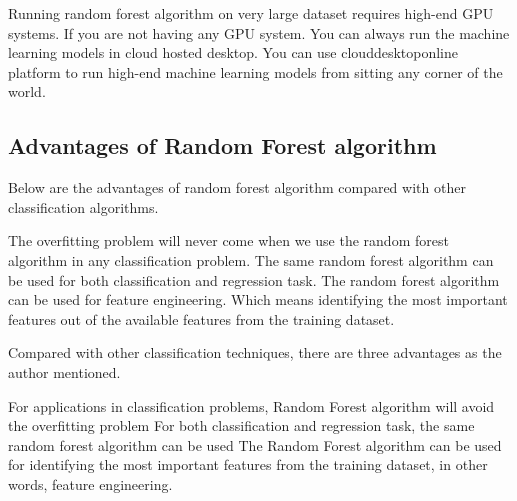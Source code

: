 Running random forest algorithm on very large dataset requires high-end GPU systems. If you are not having any GPU system. You can always run the machine learning models in cloud hosted desktop. You can use clouddesktoponline platform to run high-end machine learning models from sitting any corner of the world.

\subsection*{Advantages of Random Forest algorithm}
Below are the advantages of random forest algorithm compared with other classification algorithms.

The overfitting problem will never come when we use the random forest algorithm in any classification problem.
The same random forest algorithm can be used for both classification and regression task.
The random forest algorithm can be used for feature engineering.
Which means identifying the most important features out of the available features from the training dataset.


Compared with other classification techniques, there are three advantages as the author mentioned.

For applications in classification problems, Random Forest algorithm will avoid the overfitting problem
For both classification and regression task, the same random forest algorithm can be used
The Random Forest algorithm can be used for identifying the most important features from the training dataset, in other words, feature engineering.


